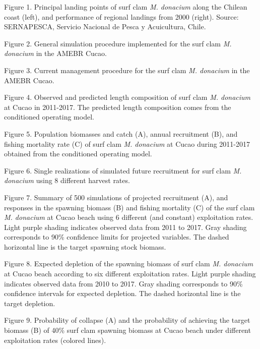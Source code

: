 \documentclass[12pt]{article}
\begin{document}
Figure 1. Principal landing points of surf clam \emph{M. donacium} along
the Chilean coast (left), and performance of regional landings from 2000
(right). Source: SERNAPESCA, Servicio Nacional de Pesca y Acuicultura,
Chile.

Figure 2. General simulation procedure implemented for the surf clam
\emph{M. donacium} in the AMEBR Cucao.

Figure 3. Current management procedure for the surf clam \emph{M.
donacium} in the AMEBR Cucao.

Figure 4. Observed and predicted length composition of surf clam
\emph{M. donacium} at Cucao in 2011-2017. The predicted length
composition comes from the conditioned operating model.

Figure 5. Population biomasses and catch (A), annual recruitment (B),
and fishing mortality rate (C) of surf clam \emph{M. donacium} at Cucao
during 2011-2017 obtained from the conditioned operating model.

Figure 6. Single realizations of simulated future recruitment for surf
clam \emph{M. donacium} using 8 different harvest rates.

Figure 7. Summary of 500 simulations of projected recruitment (A), and
responses in the spawning biomass (B) and fishing mortality (C) of the
surf clam \emph{M. donacium} at Cucao beach using 6 different (and
constant) exploitation rates. Light purple shading indicates observed
data from 2011 to 2017. Gray shading corresponds to 90\% confidence
limits for projected variables. The dashed horizontal line is the target
spawning stock biomass.

Figure 8. Expected depletion of the spawning biomass of surf clam
\emph{M. donacium} at Cucao beach according to six different
exploitation rates. Light purple shading indicates observed data from
2010 to 2017. Gray shading corresponds to 90\% confidence intervals for
expected depletion. The dashed horizontal line is the target depletion.

Figure 9. Probability of collapse (A) and the probability of achieving
the target biomass (B) of 40\% surf clam spawning biomass at Cucao beach
under different exploitation rates (colored lines).
\end{document}
